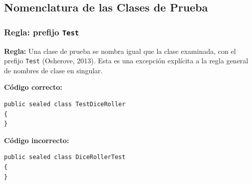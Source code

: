 \subsection{Nomenclatura de las Clases de Prueba}

\subsubsection{Regla: prefijo \texttt{Test}}

\textbf{Regla:} Una clase de prueba se nombra igual que la clase examinada, con el prefijo \texttt{Test} (Osherove, 2013). Esta es una excepción explícita a la regla general de nombres de clase en singular.

\textbf{Código correcto:}
\begin{lstlisting}[style=csharpstyle]
public sealed class TestDiceRoller
{
}
\end{lstlisting}

\textbf{Código incorrecto:}
\begin{lstlisting}[style=csharpstyle]
public sealed class DiceRollerTest
{
}
\end{lstlisting}
